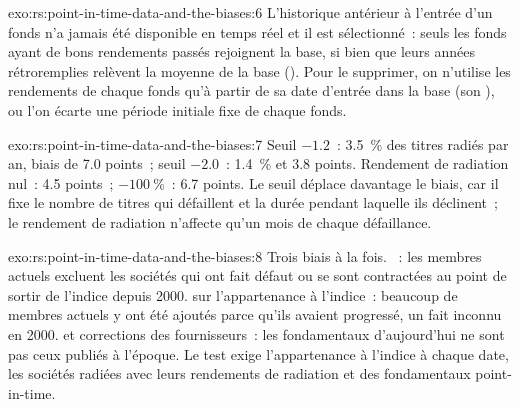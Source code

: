 \begin{solution}{exo:rs:point-in-time-data-and-the-biases:6}
L'historique antérieur à l'entrée d'un fonds n'a jamais été disponible en temps réel et il est sélectionné~: seuls les fonds ayant de bons rendements passés rejoignent la base, si bien que
leurs années rétroremplies relèvent la moyenne de la base (). Pour le supprimer, on n'utilise les rendements de chaque fonds qu'à partir de sa
date d'entrée dans la base (son ), ou l'on écarte une période initiale fixe de chaque fonds.
\end{solution}

\begin{solution}{exo:rs:point-in-time-data-and-the-biases:7}
Seuil $-1.2$~: 3.5~\% des titres radiés par an, biais de 7.0 points~; seuil $-2.0$~: 1.4~\% et 3.8 points. Rendement de radiation nul~: 4.5
points~; $-100~\%$~: 6.7 points. Le seuil déplace davantage le biais, car il fixe le nombre de titres qui défaillent et la durée pendant laquelle
ils déclinent~; le rendement de radiation n'affecte qu'un mois de chaque défaillance.
\end{solution}

\begin{solution}{exo:rs:point-in-time-data-and-the-biases:8}
Trois biais à la fois. ~: les membres actuels excluent les sociétés qui ont fait défaut ou se sont contractées au point de sortir de l'indice depuis 2000.
 sur l'appartenance à l'indice~: beaucoup de membres actuels y ont été ajoutés parce qu'ils avaient progressé, un fait inconnu en 2000. 
et corrections des fournisseurs~: les fondamentaux d'aujourd'hui ne sont pas ceux publiés à l'époque. Le test exige l'appartenance à l'indice à chaque
date, les sociétés radiées avec leurs rendements de radiation et des fondamentaux point-in-time.
\end{solution}

